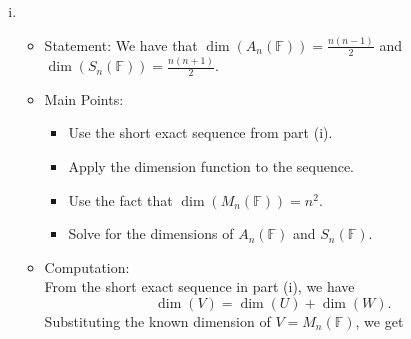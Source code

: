 \documentclass{article}
\begin{document}
\begin{enumerate}[a)]
\begin{enumerate}[i)]
\begin{itemize}
\begin{itemize}
                \item Show that $\operatorname{im}(\iota) = \ker(\epsilon)$.
            \end{itemize}
            \item Proof:
            \begin{proof}
                Define the inclusion map $\iota: U \to V$ by $\iota(A) = A$ for all $A \in U$. This map is injective because if $\iota(A) = 0$, then $A = 0$. Next, define the projection map $\epsilon: V \to W$ by
                \[
                    \epsilon(B) = \frac{1}{2}(B + B^T)
                \]
                for all $B \in V$. This map is surjective because for any $C \in W$, we can take $B = C$ and have $\epsilon(B) = C$. Finally, we need to show that $\operatorname{im}(\iota) = \ker(\epsilon)$. If $A \in U$, then $\epsilon(\iota(A)) = 0$ since $A^T = -A$. Conversely, if $B \in V$ and $\epsilon(B) = 0$, then $B^T = -B$, which means that $B$ must be in the image of $\iota$. Therefore, we have shown that the sequence
                \[
                    0 \xrightarrow{} U \xrightarrow{\iota} V \xrightarrow{\epsilon} W \xrightarrow{} 0
                \]
                is a short exact sequence.
            \end{proof}
        \end{itemize} \newpage
        \item \begin{itemize}
            \item Statement: We have that $\dim(A_n(\mathbb{F})) = \frac{n(n-1)}{2}$ and $\dim(S_n(\mathbb{F})) = \frac{n(n+1)}{2}$.
            \item Main Points:
            \begin{itemize}
                \item Use the short exact sequence from part (i).
                \item Apply the dimension function to the sequence.
                \item Use the fact that $\dim(M_n(\mathbb{F})) = n^2$.
                \item Solve for the dimensions of $A_n(\mathbb{F})$ and $S_n(\mathbb{F})$.
            \end{itemize}
            \item Computation: \\
            From the short exact sequence in part (i), we have
            \[
                \dim(V) = \dim(U) + \dim(W).
            \]
            Substituting the known dimension of $V = M_n(\mathbb{F})$, we get

\end{itemize}
\end{enumerate}
\end{enumerate}
\end{document}
